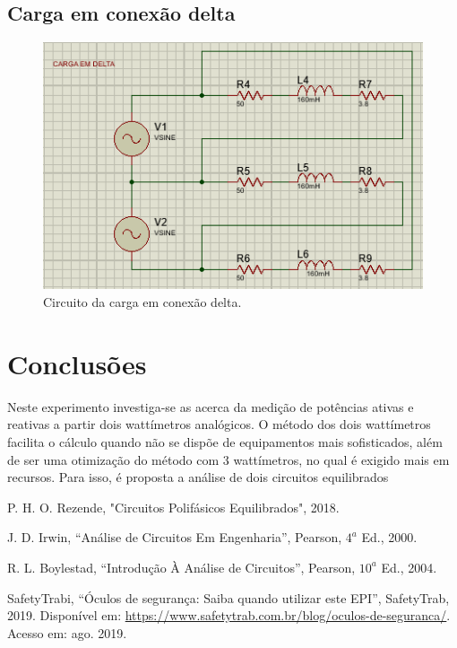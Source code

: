\documentclass[a4paper,12pt,oneside,openany,table,xcdraw]{article}
\begin{document}
\subsection{Carga em conexão delta}
\begin{figure}[H]
\centering
\includegraphics[width=14cm]{sim2}
\caption{Circuito da carga em conexão delta.}
\label{sim2}
\end{figure}

\section{Conclusões} %
Neste experimento investiga-se as acerca da medição de potências ativas e reativas a partir dois wattímetros analógicos. O método dos dois wattímetros facilita o cálculo quando não se dispõe de equipamentos mais sofisticados, além de ser uma otimização do método com 3 wattímetros, no qual é exigido mais em recursos. Para isso, é proposta a análise de dois circuitos equilibrados


\newpage
\begin{thebibliography}{9} 
    P. H. O. Rezende,
    "Circuitos Polifásicos Equilibrados", 2018.

    J. D. Irwin,
    “Análise de Circuitos Em Engenharia”, Pearson, $4^a$ Ed., 2000.

    R. L. Boylestad,
    “Introdução À Análise de Circuitos”, Pearson, $10^a$ Ed., 2004.

    SafetyTrabi,
    “Óculos de segurança: Saiba quando utilizar este EPI”, SafetyTrab, 2019.
 Disponível em:
 \url{https://www.safetytrab.com.br/blog/oculos-de-seguranca/}. Acesso em: ago. 2019.


\end{thebibliography}
\end{document}
